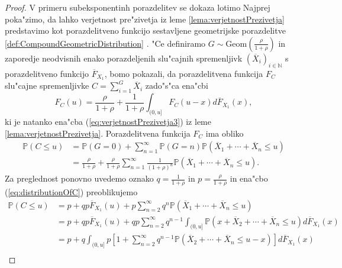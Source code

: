 \documentclass[12pt, a4paper, reqno]{amsart}
\theoremstyle{definition}
\theoremstyle{plain}
\newcommand{\N}{\mathbb{N}}
\newcommand{\Prob}{\mathbb{P}}
\newcommand{\1}{\mathds{1}}
\newcommand*{\refPriloga}[1]{%
  \begingroup
    \hypersetup{
      linkcolor=properpurple,
      linkbordercolor=properpurple,
    }%
    \ref{#1}%
  \endgroup
}
\begin{document}
        \begin{proof}
            V primeru subeksponentinh porazdelitev se dokaza lotimo 
            Najprej poka"zimo, da lahko verjetnost 
            pre"zivetja iz leme \ref{lema:verjetnostPrezivetja} 
            predstavimo kot porazdelitveno funkcijo sestavljene
            geometrijske porazdelitve \refPriloga{def:CompoundGeometricDistribution}. "Ce definiramo 
            $G \sim \text{Geom}(\frac{\rho}{1 + \rho})$ in zaporedje neodvisnih enako porazdeljenih 
            slu"cajnih spremenljivk $(\overline{X}_i)_{i\in\N}$ s porazdelitveno funkcijo $\overline{F}_{X_1}$, 
            bomo pokazali, da porazdelitvena funkcija $F_C$ slu"cajne spremenljivke
            $C = \sum_{i=1}^{G}\overline{X}_i$ zado"s"ca ena"cbi 
            \begin{equation}
                F_C(u) = \frac{\rho}{1 + \rho} + \frac{1}{1 + \rho}\int_{(0, u]}F_C(u - x)d\overline{F}_{X_1}(x),
                \label{eq:verjetnostPrezivetja4}
            \end{equation}
            ki je natanko ena"cba (\ref{eq:verjetnostPrezivetja3}) iz leme \ref{lema:verjetnostPrezivetja}.
            Porazdelitvena funkcija $F_C$ ima obliko
            \begin{align}
                \Prob\left(C \leq u\right)  &= \Prob\left(G = 0\right) + \sum_{n = 1}^\infty\Prob\left(G = n\right)\Prob\left(\overline{X}_1 + \cdots + \overline{X}_{n} \leq u\right) \nonumber\\
                                            &= \frac{\rho}{1 + \rho} + \frac{\rho}{1 + \rho}\sum_{n = 1}^\infty\frac{1}{(1 + \rho)^n}\Prob\left(\overline{X}_1 + \cdots + \overline{X}_{n} \leq u\right). \label{eq:distributionOfC}
            \end{align}
            Za preglednost ponovno uvedemo oznako $q= \frac{1}{1 + \rho}$ in 
             $p = \frac{\rho}{1 + \rho}$ in ena"cbo (\ref{eq:distributionOfC}) preoblikujemo 
            \begin{align*}
                \Prob\left(C \leq u\right)  
                    &= p + qp\overline{F}_{X_1}(u) + p\sum_{n = 2}^\infty q^{n}\Prob\left(\overline{X}_1 + \cdots + \overline{X}_{n} \leq u\right) \\
                    &= p + qp\overline{F}_{X_1}(u) + qp\sum_{n = 2}^\infty q^{n-1}\int_{(0, u]}\Prob\left(x + \overline{X}_2 + \cdots + \overline{X}_{n} \leq u\right)d\overline{F}_{X_1}(x) \\
                    &= p + q\int_{(0, u]}p\left[1 + \sum_{n = 2}^\infty q^{n-1}\Prob\left(\overline{X}_2 + \cdots + \overline{X}_n \leq u - x\right)\right]d\overline{F}_{X_1}(x) \\

\end{align*}
\end{proof}
\end{document}
